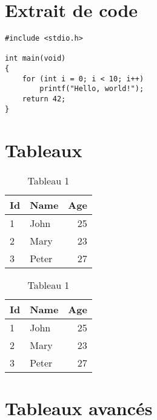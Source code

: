 \documentclass{article}
\begin{document}
\listoffigures
\listoftables
\lstlistoflistings

\section{Extrait de code}

\begin{lstlisting}[caption={My Caption},captionpos=b]
#include <stdio.h>

int main(void)
{
    for (int i = 0; i < 10; i++)
        printf("Hello, world!");
    return 42;
}
\end{lstlisting}

\section{Tableaux}

\begin{table}[h]
\centering
    \caption{Tableau 1 \label{tb:tableau1}}
    \begin{tabular}{|lp{5cm}|r||}\hline
        Id & Name & Age \\
        \hline\hline
        1 & John & 25 \\ \hline
        2 & Mary & 23 \\ 
        3 & Peter & 27 \\ \hline
    \end{tabular}
\end{table}    

\begin{table}[h]
    \centering
        \caption{Tableau 1 \label{tb:tableau1}}
        \begin{tabularx}{\textwidth}{lXr}
            \toprule
            Id & Name & Age \\
            \midrule
            1 & John & 25 \\ 
            2 & Mary & 23 \\ 
            3 & Peter & 27 \\ 
            \bottomrule
        \end{tabularx}
    \end{table}    
\lipsum[1-2]

\section{Tableaux avancés}
\end{document}
